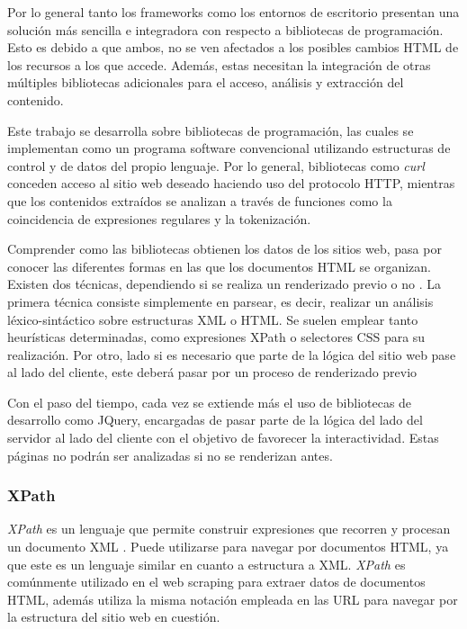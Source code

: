 Por lo general tanto los frameworks como los entornos de escritorio presentan una solución más sencilla
e integradora con respecto a bibliotecas de programación. Esto es debido a que ambos, no se ven afectados
a los posibles cambios HTML de los recursos a los que accede. Además, estas necesitan la integración de
otras múltiples bibliotecas adicionales para el acceso, análisis y extracción del contenido.

Este trabajo se desarrolla sobre bibliotecas de programación, las cuales se implementan como un programa
software convencional utilizando estructuras de control y de datos del propio lenguaje. Por lo general,
bibliotecas como \emph{curl \cite{curl-cran}} conceden acceso al sitio web deseado haciendo uso del
protocolo HTTP, mientras que los contenidos extraídos se analizan a través de funciones como la
coincidencia de expresiones regulares y la tokenización.

Comprender como las bibliotecas obtienen los datos de los sitios web, pasa por conocer las diferentes
formas en las que los documentos HTML se organizan. Existen dos técnicas, dependiendo si se realiza un
renderizado previo o no \cite{tfg-daniel-francisco-lopez}. La primera técnica consiste simplemente en
parsear, es decir, realizar un análisis léxico-sintáctico sobre estructuras XML o HTML. Se suelen emplear
tanto heurísticas determinadas, como expresiones XPath o selectores CSS para su realización. Por otro,
lado si es necesario que parte de la lógica del sitio web pase al lado del cliente, este deberá pasar por
un proceso de renderizado previo

Con el paso del tiempo, cada vez se extiende más el uso de bibliotecas de desarrollo como JQuery, encargadas 
de pasar parte de la lógica del lado del servidor al lado del cliente con el objetivo de favorecer la 
interactividad. Estas páginas no podrán ser analizadas si no se renderizan antes.

\subsubsection{XPath}
\label{subsubsec:xpath}

\emph{XPath} es un lenguaje que permite construir expresiones que recorren y procesan un documento XML
\cite{xpath-wikipedia}. Puede utilizarse para navegar por documentos HTML, ya que este es un lenguaje
similar en cuanto a estructura a XML. \emph{XPath} es comúnmente utilizado en el web scraping para extraer
datos de documentos HTML, además utiliza la misma notación empleada en las URL para navegar por la
estructura del sitio web en cuestión.

